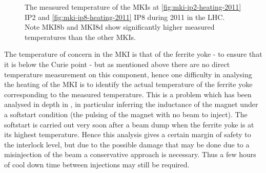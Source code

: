 \begin{figure}
\begin{center}
\end{center}
\caption{The measured temperature of the MKIs at \ref{fig:mki-ip2-heating-2011} IP2 and \ref{fig:mki-ip8-heating-2011} IP8 during 2011 in the LHC. Note MKI8b and MKI8d show significantly higher measured temperatures than the other MKIs.}
\label{fig:mki-heating-2011}
\end{figure}

The temperature of concern in the MKI is that of the ferrite yoke - to ensure that it is below the Curie point - but as mentioned above there are no direct temperature measurement on this component, hence one difficulty in analysing the heating of the MKI is to identify the actual temperature of the ferrite yoke corresponding to the measured temperature. This is a problem which has been analysed in depth in \cite{Barnes:mkiHeating}, in particular inferring the inductance of the magnet under a softstart condition (the pulsing of the magnet with no beam to inject). The softstart is carried out very soon after a beam dump when the ferrite yoke is at its highest temperature. Hence this analysis gives a certain margin of safety to the interlock level, but due to the possible damage that may be done due to a misinjection of the beam a conservative approach is necessary. Thus a few hours of cool down time between injections may still be required.

